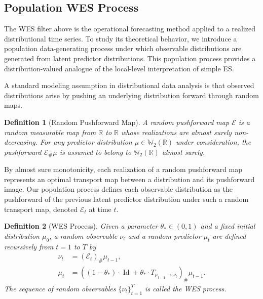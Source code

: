 \documentclass[a4paper, 11pt]{article}
\newcommand{\R}{\mathbb{R}}
\newcommand{\T}{\mathcal E}
\newtheorem{definition}{Definition}
\theoremstyle{definition}
\begin{document}
\subsection{Population WES Process} \label{sec:sample} 

The WES filter above is the operational forecasting method applied to a realized distributional time series.
To study its theoretical behavior, we introduce a population data-generating process under which observable distributions are generated from latent predictor distributions.
This population process provides a distribution-valued analogue of the local-level interpretation of simple ES.

A standard modeling assumption in distributional data analysis \citep{Panaretos2020} is that observed distributions arise by pushing an underlying distribution forward through random maps.

\begin{definition}[Random Pushforward Map]
	A random pushforward map $\T$ is a random measurable map from $\R$ to $\R$ whose realizations are almost surely non-decreasing.
	For any predictor distribution $\mu\in\mathbb{W}_2(\R)$ under consideration, the pushforward $\T_{\#}\mu$ is assumed to belong to $\mathbb{W}_2(\R)$ almost surely.
\end{definition}

By almost sure monotonicity, each realization of a random pushforward map represents an optimal transport map between a distribution and its pushforward image.
Our population process defines each observable distribution as the pushforward of the previous latent predictor distribution under such a random transport map, denoted $\T_t$ at time $t$.

\begin{definition}[WES Process] \label{def:wesp}
	Given a parameter $\theta_* \in (0, 1)$ and a fixed initial distribution $\mu_0$, a random observable $\nu_t$ and a random predictor $\mu_t$ are defined recursively from $t = 1$ to $T$ by
	\begin{align}
	    \nu_t &= \left( \T_t \right)_{\#} \mu_{t-1} , \label{eq:WES_process_formula 1} \\ 
        \mu_t &= \left( (1 - \theta_*) \cdot \operatorname{Id} + \theta_* \cdot T_{\mu_{t-1} \to \nu_{t}} \right)_{\#} \mu_{t-1} . \label{eq:WES_process_formula 2}
    \end{align}
    The sequence of random observables $\{ \nu_t \}_{t=1}^{T}$ is called the WES process.
\end{definition}
\end{document}
